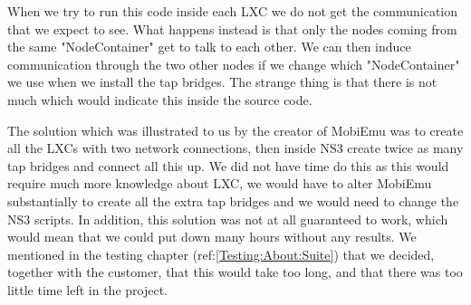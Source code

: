 	When we try to run this code inside each \gls{LXC} we do not get the communication that we expect to see. What happens instead is that only the nodes coming from the same "NodeContainer" get to talk to each other. We can then induce communication through the two other nodes if we change which "NodeContainer" we use when we install the tap bridges. The strange thing is that there is not much which would indicate this inside the source code.
	
	The solution which was illustrated to us by the creator of MobiEmu was to create all the LXCs with two network connections, then inside NS3 create twice as many tap bridges and connect all this up. We did not have time do this as this would require much more knowledge about LXC, we would have to alter MobiEmu substantially to create all the extra tap bridges and we would need to change the NS3 scripts. In addition, this solution was not at all guaranteed to work, which would mean that we could put down many hours without any results. We mentioned in the testing chapter (ref:\ref{Testing:About:Suite}) that we decided, together with the customer, that this would take too long, and that there was too little time left in the project.

